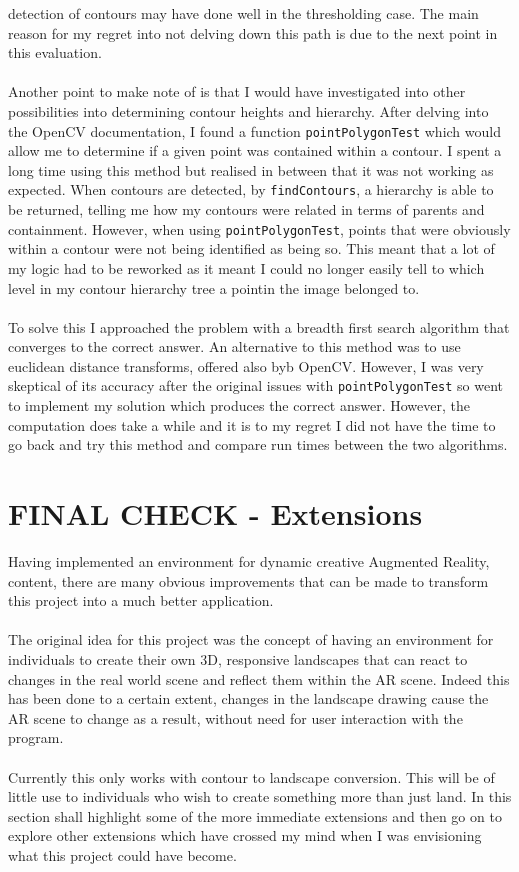 \documentclass[11pt]{article}
\begin{document}
detection of contours may have done well in the thresholding case. The
main reason for my regret into not delving down this path is due to the
next point in this evaluation.\\
\\
Another point to make note of is that I would have investigated into 
other possibilities into determining contour heights and hierarchy. After
delving into the OpenCV documentation, I found a function
\texttt{pointPolygonTest} which would allow me to determine if a given
point was contained within a contour. I spent a long time using this 
method but realised in between that it was not working as expected.
When contours are detected, by \texttt{findContours}, a hierarchy
is able to be returned, telling me how my contours were related in terms
of parents and containment. However, when using \texttt{pointPolygonTest},
points that were obviously within a contour were not being identified
as being so. This meant that a lot of my logic had to be reworked
as it meant I could no longer easily tell to which level in my contour
hierarchy tree a pointin the image belonged to.\\
\\
To solve this I approached the problem with a breadth first search algorithm
that converges to the correct answer. An alternative to this method was
to use euclidean distance transforms, offered also byb OpenCV. However,
I was very skeptical of its accuracy after the original issues with
\texttt{pointPolygonTest} so went to implement my solution which produces
the correct answer. However, the computation does take a while and it is
to my regret I did not have the time to go back and try this method and
compare run times between the two algorithms.

\section{FINAL CHECK - Extensions}
\label{chapter:extensions}
Having implemented an environment for dynamic creative Augmented Reality,
content, there are many obvious improvements that can be made to transform 
this project into a much better application. \\
\\
The original idea for this project was the concept of having an environment
for individuals to create their own 3D, responsive landscapes that can react
to changes in the real world scene and reflect them within the AR scene. Indeed
this has been done to a certain extent, changes in the landscape drawing cause
the AR scene to change as a result, without need for user interaction with the
program.\\
\\
Currently this only works with contour to landscape conversion. This
will be of little use to individuals who wish to create something more 
than just land. In this section shall highlight some of the more 
immediate extensions and then go on to explore other extensions 
which have crossed my mind when I was envisioning what 
this project could have become.
\end{document}
